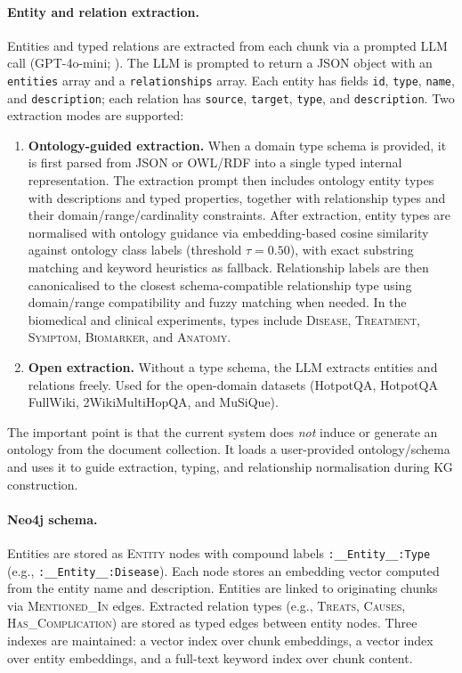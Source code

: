 \paragraph{Entity and relation extraction.}
Entities and typed relations are extracted from each chunk via a prompted
LLM call (GPT-4o-mini; \citealp{openai2024gpt4omini}).
The LLM is prompted to return a JSON object with an \texttt{entities}
array and a \texttt{relationships} array.
Each entity has fields \texttt{id}, \texttt{type}, \texttt{name}, and
\texttt{description}; each relation has \texttt{source}, \texttt{target},
\texttt{type}, and \texttt{description}.
Two extraction modes are supported:

\begin{enumerate}
  \item \textbf{Ontology-guided extraction.} When a domain type schema is
    provided, it is first parsed from JSON or OWL/RDF into a single typed
    internal representation.
    The extraction prompt then includes ontology entity types with
    descriptions and typed properties, together with relationship types and
    their domain/range/cardinality constraints.
    After extraction, entity types are normalised with ontology guidance via
    embedding-based cosine similarity against ontology class labels
    (threshold $\tau = 0.50$), with exact substring matching and keyword
    heuristics as fallback.
    Relationship labels are then canonicalised to the closest
    schema-compatible relationship type using domain/range compatibility and
    fuzzy matching when needed.
    In the biomedical and clinical experiments, types include
    \textsc{Disease}, \textsc{Treatment}, \textsc{Symptom},
    \textsc{Biomarker}, and \textsc{Anatomy}.

  \item \textbf{Open extraction.} Without a type schema, the LLM extracts
    entities and relations freely.
    Used for the open-domain datasets (HotpotQA, HotpotQA FullWiki,
    2WikiMultiHopQA, and MuSiQue).
\end{enumerate}

The important point is that the current system does \emph{not} induce or
generate an ontology from the document collection.
It loads a user-provided ontology/schema and uses it to guide extraction,
typing, and relationship normalisation during KG construction.

\paragraph{Neo4j schema.}
Entities are stored as \textsc{Entity} nodes with compound labels
\texttt{:\_\_Entity\_\_:Type} (e.g., \texttt{:\_\_Entity\_\_:Disease}).
Each node stores an embedding vector computed from the entity name and
description.
Entities are linked to originating chunks via \textsc{Mentioned\_In} edges.
Extracted relation types (e.g., \textsc{Treats}, \textsc{Causes},
\textsc{Has\_Complication}) are stored as typed edges between entity nodes.
Three indexes are maintained: a vector index over chunk embeddings, a
vector index over entity embeddings, and a full-text keyword index over
chunk content.

